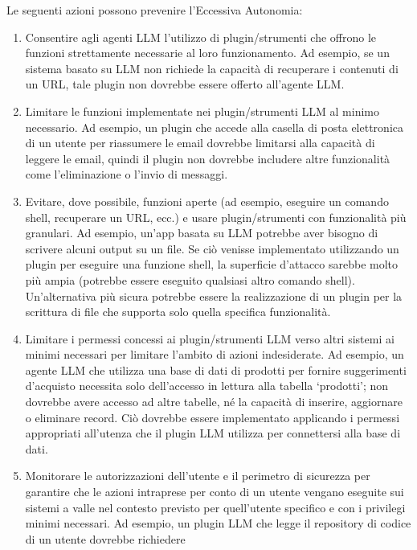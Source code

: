 \documentclass[
]{article}
\providecommand{\tightlist}{%
  \setlength{\itemsep}{0pt}\setlength{\parskip}{0pt}}
\begin{document}
Le seguenti azioni possono prevenire l'Eccessiva Autonomia:

\begin{enumerate}
\def\labelenumi{\arabic{enumi}.}
\tightlist
\item
  Consentire agli agenti LLM l'utilizzo di plugin/strumenti che offrono
  le funzioni strettamente necessarie al loro funzionamento. Ad esempio,
  se un sistema basato su LLM non richiede la capacità di recuperare i
  contenuti di un URL, tale plugin non dovrebbe essere offerto
  all'agente LLM.
\item
  Limitare le funzioni implementate nei plugin/strumenti LLM al minimo
  necessario. Ad esempio, un plugin che accede alla casella di posta
  elettronica di un utente per riassumere le email dovrebbe limitarsi
  alla capacità di leggere le email, quindi il plugin non dovrebbe
  includere altre funzionalità come l'eliminazione o l'invio di
  messaggi.
\item
  Evitare, dove possibile, funzioni aperte (ad esempio, eseguire un
  comando shell, recuperare un URL, ecc.) e usare plugin/strumenti con
  funzionalità più granulari. Ad esempio, un'app basata su LLM potrebbe
  aver bisogno di scrivere alcuni output su un file. Se ciò venisse
  implementato utilizzando un plugin per eseguire una funzione shell, la
  superficie d'attacco sarebbe molto più ampia (potrebbe essere eseguito
  qualsiasi altro comando shell). Un'alternativa più sicura potrebbe
  essere la realizzazione di un plugin per la scrittura di file che
  supporta solo quella specifica funzionalità.
\item
  Limitare i permessi concessi ai plugin/strumenti LLM verso altri
  sistemi ai minimi necessari per limitare l'ambito di azioni
  indesiderate. Ad esempio, un agente LLM che utilizza una base di dati
  di prodotti per fornire suggerimenti d'acquisto necessita solo
  dell'accesso in lettura alla tabella `prodotti'; non dovrebbe avere
  accesso ad altre tabelle, né la capacità di inserire, aggiornare o
  eliminare record. Ciò dovrebbe essere implementato applicando i
  permessi appropriati all'utenza che il plugin LLM utilizza per
  connettersi alla base di dati.
\item
  Monitorare le autorizzazioni dell'utente e il perimetro di sicurezza
  per garantire che le azioni intraprese per conto di un utente vengano
  eseguite sui sistemi a valle nel contesto previsto per quell'utente
  specifico e con i privilegi minimi necessari. Ad esempio, un plugin
  LLM che legge il repository di codice di un utente dovrebbe richiedere

\end{enumerate}
\end{document}
